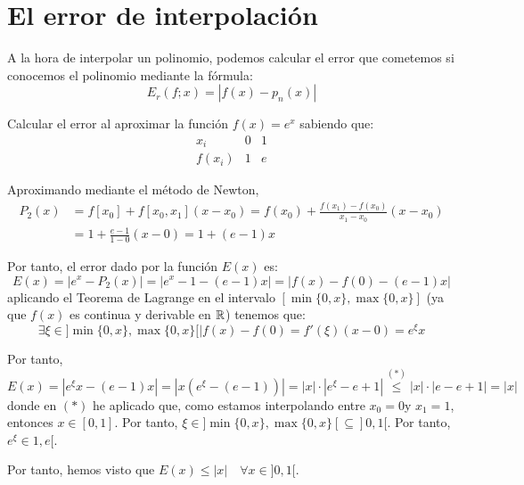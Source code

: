 \section{El error de interpolación}
A la hora de interpolar un polinomio, podemos calcular el error que cometemos si conocemos el polinomio
mediante la fórmula:
$$E_r (f; x) = |f(x) - p_n(x)|$$

\begin{ejemplo}
    Calcular el error al aproximar la función $f(x)=e^x$ sabiendo que:
    \begin{equation*}
        \begin{array}{c|cc}
            x_i & 0 & 1 \\ \hline
            f(x_i) & 1 & e
        \end{array}
    \end{equation*}

    Aproximando mediante el método de Newton,
    \begin{equation*}\begin{split}
        P_2(x)&
        = f[x_0] + f[x_0,x_1](x-x_0)
        = f(x_0) + \frac{f(x_1) - f(x_0)}{x_1 - x_0} (x-x_0) \\
        &= 1 + \frac{e - 1}{1-0} (x-0)
        = 1+(e-1)x
    \end{split}\end{equation*}

    Por tanto, el error dado por la función $E(x)$ es:
    \begin{equation*}
        E(x) = |e^x - P_2(x)| = |e^x - 1 - (e-1)x| = |f(x)-f(0) - (e-1)x|
    \end{equation*}
    aplicando el Teorema de Lagrange en el intervalo $[\min\{0,x\},\max\{0,x\}]$ (ya que $f(x)$ es continua y derivable en $\mathbb{R}$) tenemos que:
    \begin{equation*}
        \exists \xi \in ]\min\{0,x\},\max\{0,x\}[ \mid f(x)-f(0) = f'(\xi)(x-0) = e^\xi x
    \end{equation*}
    
    Por tanto,
    \begin{equation*}
        E(x)=|e^\xi x - (e-1)x| = |x(e^\xi - (e-1))| = |x|\cdot |e^\xi -e+1| \stackrel{(\ast)}{\leq}
        |x|\cdot |e -e+1| = |x|
    \end{equation*}
    donde en $(\ast)$ he aplicado que, como estamos interpolando entre $x_0=0$y $x_1=1$, entonces $x\in[0,1]$. Por tanto, $\xi \in ]\min\{0,x\},\max\{0,x\}[ \subseteq ]0,1[$. Por tanto, $e^\xi \in1,e[$.
    
    Por tanto, hemos visto que $E(x)\leq |x|\quad \forall x\in ]0,1[$.
\end{ejemplo}

